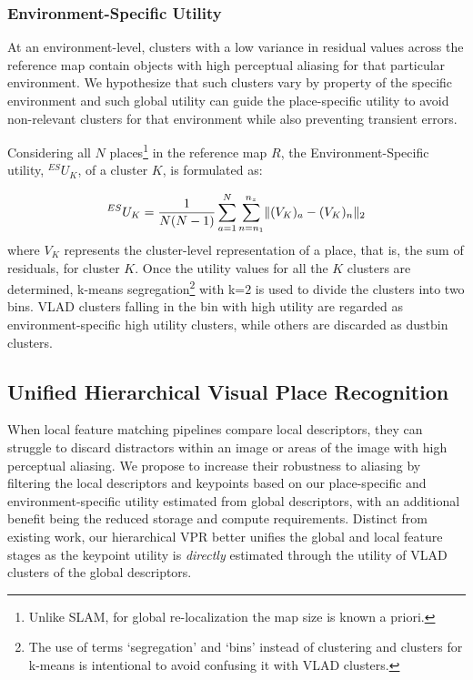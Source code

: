 \documentclass[letterpaper, 10 pt, conference]{ieeeconf}  \fi
\begin{document}
\subsubsection{Environment-Specific Utility}
\label{sec:ES}

At an environment-level, clusters with a low variance in residual values across the reference map contain objects with high perceptual aliasing for that particular environment. We hypothesize that such clusters vary by property of the specific environment and such global utility can guide the place-specific utility to avoid non-relevant clusters for that environment while also preventing transient errors.

Considering all $N$ places\footnote{Unlike SLAM, for global re-localization the map size is known a priori.} in the reference map $R$, the Environment-Specific utility, $_{}^{ES}U_K$, of a cluster $K$, is formulated as:

\begin{equation}
\centering
    _{}^{ES}U_K = \frac{1}{N(N-1)}\sum_{a=1}^{N}\sum_{n=n_1}^{n_z} \lVert (V_K)_a - (V_K)_n \rVert_2
\end{equation}
where $V_K$ represents the cluster-level representation of a place, that is, the sum of residuals, for cluster $K$. Once the utility values for all the $K$ clusters are determined, k-means segregation\footnote{The use of terms `segregation' and `bins' instead of clustering and clusters for k-means is intentional to avoid confusing it with VLAD clusters.} with k=$2$ is used to divide the clusters into two bins. VLAD clusters falling in the bin with high utility are regarded as environment-specific high utility clusters, while others are discarded as dustbin clusters.

\subsection{Unified Hierarchical Visual Place Recognition}
\label{sec:HierApp}

When local feature matching pipelines compare local descriptors, they can struggle to discard distractors within an image or areas of the image with high perceptual aliasing. We propose to increase their robustness to aliasing by filtering the local descriptors and keypoints based on our place-specific and environment-specific utility estimated from global descriptors, with an additional benefit being the reduced storage and compute requirements. Distinct from existing work, our hierarchical VPR better unifies the global and local feature stages as the keypoint utility is \textit{directly} estimated through the utility of VLAD clusters of the global descriptors.
\end{document}
